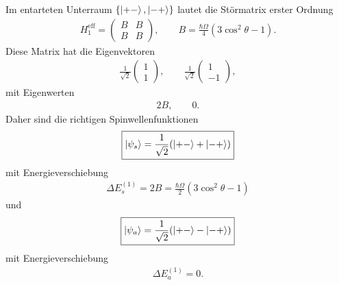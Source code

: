 \documentclass[11pt,a4paper]{scrartcl}
\begin{document}
\begin{enumerate}[label=(\alph*)]
\begin{calculationbox}
            \begin{calculationbox}[title=Störmatrix und Diagonalisierung]
                Im entarteten Unterraum $\{\ket{+-},\ket{-+}\}$ lautet die Störmatrix erster Ordnung
                \begin{align*}
                    H_1^{\mathrm{eff}}
                    =
                    \begin{pmatrix}
                        B&B\\
                        B&B
                    \end{pmatrix},
                    \qquad
                    B
                    =
                    \frac{\hbar\Omega}{4}(3\cos^2\theta-1).
                \end{align*}
                Diese Matrix hat die Eigenvektoren
                \begin{align*}
                    \frac{1}{\sqrt2}
                    \begin{pmatrix}1\\1\end{pmatrix},
                    \qquad
                    \frac{1}{\sqrt2}
                    \begin{pmatrix}1\\-1\end{pmatrix},
                \end{align*}
                mit Eigenwerten
                \begin{align*}
                    2B,
                    \qquad
                    0.
                \end{align*}
                Daher sind die richtigen Spinwellenfunktionen
                \begin{align*}
                    \boxed{
                    \ket{\psi_s}
                    =
                    \frac{1}{\sqrt2}(\ket{+-}+\ket{-+})}
                \end{align*}
                mit Energieverschiebung
                \begin{align*}
                    \boxed{
                    \Delta E_s^{(1)}
                    =
                    2B
                    =
                    \frac{\hbar\Omega}{2}(3\cos^2\theta-1)}
                \end{align*}
                und
                \begin{align*}
                    \boxed{
                    \ket{\psi_a}
                    =
                    \frac{1}{\sqrt2}(\ket{+-}-\ket{-+})}
                \end{align*}
                mit Energieverschiebung
                \begin{align*}
                    \boxed{
                    \Delta E_a^{(1)}=0}.
                \end{align*}
            \end{calculationbox}
        \end{calculationbox}


\end{enumerate}
\end{document}
